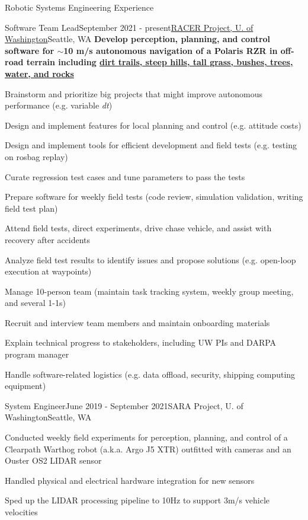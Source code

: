 \documentclass{resume} %
\begin{document}
\begin{rSection}{Robotic Systems Engineering Experience}

\begin{rSubsection}{Software Team Lead}{September 2021 - present}{\href{https://www.apl.uw.edu/project/project.php?id=racer}{RACER Project, U. of Washington}}{Seattle, WA}
{\bf\small Develop perception, planning, and control software for $\sim$10 m/s autonomous navigation of a Polaris RZR in off-road terrain including \href{https://www.youtube.com/watch?v=AlNOzhza7pg}{dirt trails, steep hills, tall grass, bushes, trees, water, and rocks}}
\item Brainstorm and prioritize big projects that might improve autonomous performance (e.g. variable {\it dt})
\item Design and implement features for local planning and control (e.g. attitude costs)
\item Design and implement tools for efficient development and field tests (e.g. testing on rosbag replay)
\item Curate regression test cases and tune parameters to pass the tests
\item Prepare software for weekly field tests (code review, simulation validation, writing field test plan)
\item Attend field tests, direct experiments, drive chase vehicle, and assist with recovery after accidents
\item Analyze field test results to identify issues and propose solutions (e.g. open-loop execution at waypoints)
\item Manage 10-person team (maintain task tracking system, weekly group meeting, and several 1-1s)
\item Recruit and interview team members and maintain onboarding materials
\item Explain technical progress to stakeholders, including UW PIs and DARPA program manager
\item Handle software-related logistics (e.g. data offload, security, shipping computing equipment)
\end{rSubsection}

\begin{rSubsection}{System Engineer}{June 2019 - September 2021}{SARA Project, U. of Washington}{Seattle, WA}
\item Conducted weekly field experiments for perception, planning, and control of a Clearpath Warthog robot (a.k.a. Argo J5 XTR) outfitted with cameras and an Ouster OS2 LIDAR sensor
\item Handled physical and electrical hardware integration for new sensors
\item Sped up the LIDAR processing pipeline to 10Hz to support 3m/s vehicle velocities
\end{rSubsection}


\end{rSection}
\end{document}
